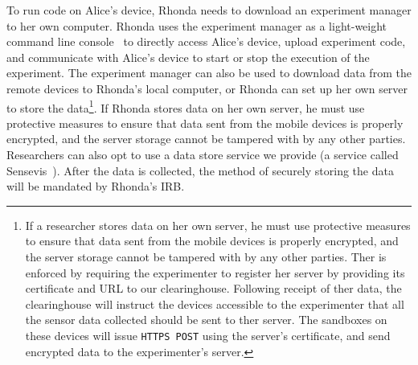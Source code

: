 To run code on Alice's device, Rhonda needs to download an experiment 
manager to her own computer.
Rhonda uses the experiment manager as a light-weight command line 
console~\cite{demo-kit} to directly access Alice's device, upload 
experiment code, and %
communicate with Alice's device to start or stop the execution of the experiment. 
The experiment manager can also be used to download data 
from the remote devices to Rhonda's local computer, or
Rhonda can set up her own server to store the data\footnote{\scriptsize
If a researcher stores data on her own server, he must use protective
measures to ensure that data sent from the mobile devices is
properly encrypted, and the server storage cannot be tampered
with by any other parties. Ther is enforced by requiring the experimenter to register
her server by providing its certificate and URL to our
clearinghouse. Following receipt of ther data, the clearinghouse will instruct the devices
accessible to the experimenter that all the sensor data collected should be
sent to ther server. The sandboxes on these devices will issue
\texttt{HTTPS POST} using the server's certificate, and send encrypted
data to the experimenter's server.}. 
If Rhonda stores data on her own server, he must use protective
measures to ensure that data sent from the mobile devices is
properly encrypted, and the server storage cannot be tampered
with by any other parties. Researchers can also opt to use a data 
store service we provide (a service called Sensevis~\cite{sensevis}). 
After the data is collected, the method of 
securely storing the data will be mandated by Rhonda's IRB.

